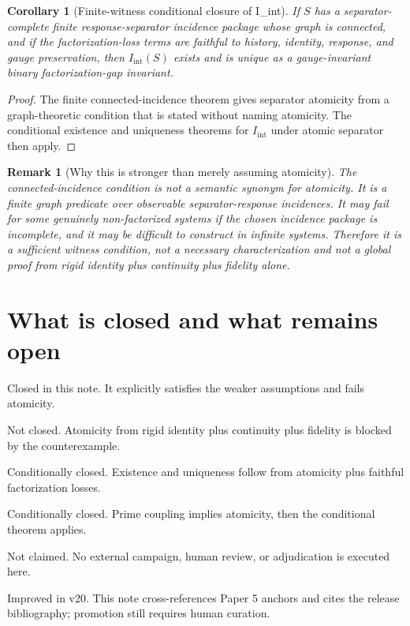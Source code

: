 \documentclass[11pt]{article}
\newtheorem{corollary}[definition]{Corollary}
\newtheorem{remark}[definition]{Remark}
\newcommand{\Iint}{I_{\mathrm{int}}}
\begin{document}
\begin{corollary}[Finite-witness conditional closure of I\_int]
If $S$ has a separator-complete finite response-separator incidence package whose graph is connected, and if the factorization-loss terms are faithful to history, identity, response, and gauge preservation, then $\Iint(S)$ exists and is unique as a gauge-invariant binary factorization-gap invariant.
\end{corollary}

\begin{proof}
The finite connected-incidence theorem gives separator atomicity from a graph-theoretic condition that is stated without naming atomicity. The conditional existence and uniqueness theorems for $\Iint$ under atomic separator then apply.
\end{proof}

\begin{remark}[Why this is stronger than merely assuming atomicity]
The connected-incidence condition is not a semantic synonym for atomicity. It is a finite graph predicate over observable separator-response incidences. It may fail for some genuinely non-factorized systems if the chosen incidence package is incomplete, and it may be difficult to construct in infinite systems. Therefore it is a sufficient witness condition, not a necessary characterization and not a global proof from rigid identity plus continuity plus fidelity alone.
\end{remark}

\section{What is closed and what remains open}

\begin{description}[leftmargin=4.2cm]
  \item[Product-separator counterexample.] Closed in this note. It explicitly satisfies the weaker assumptions and fails atomicity.
  \item[Global derivation.] Not closed. Atomicity from rigid identity plus continuity plus fidelity is blocked by the counterexample.
  \item[$\Iint$ under atomic separator.] Conditionally closed. Existence and uniqueness follow from atomicity plus faithful factorization losses.
  \item[$\Iint$ under prime coupling.] Conditionally closed. Prime coupling implies atomicity, then the conditional theorem applies.
  \item[Empirical or external support.] Not claimed. No external campaign, human review, or adjudication is executed here.
  \item[Registry integration.] Improved in v20. This note cross-references Paper 5 anchors and cites the release bibliography; promotion still requires human curation.
\end{description}
\end{document}
